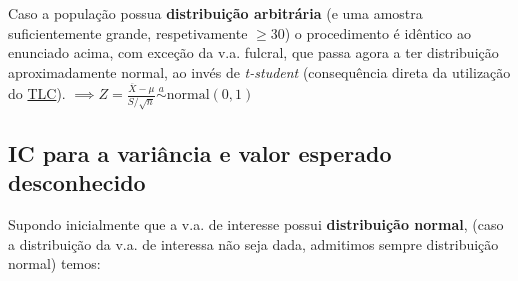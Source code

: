 \noindent Caso a população possua \textbf{distribuição arbitrária} (e uma amostra suficientemente grande, respetivamente $\ge 30$) o procedimento é idêntico ao enunciado acima, com exceção da v.a. fulcral, que passa agora a ter distribuição aproximadamente normal, ao invés de \textit{t-student} (consequência direta da utilização do  \hyperref[def:tlc]{TLC}). \hfill $\implies Z = \frac{\overline{X} - \mu}{S/\sqrt{n}} \overset{a}{\sim} \text{normal}(0,1)$

\subsection[5.3 IC para a variância e valor esperado desconhecido]{\hspace*{0.075 em}\raisebox{0.2 em}{$\pmb{\drsh}$} IC para a variância e valor esperado desconhecido}

\noindent Supondo inicialmente que a v.a. de interesse possui \textbf{distribuição normal}, (caso a distribuição da v.a. de interessa não seja dada, admitimos sempre distribuição normal) temos:


